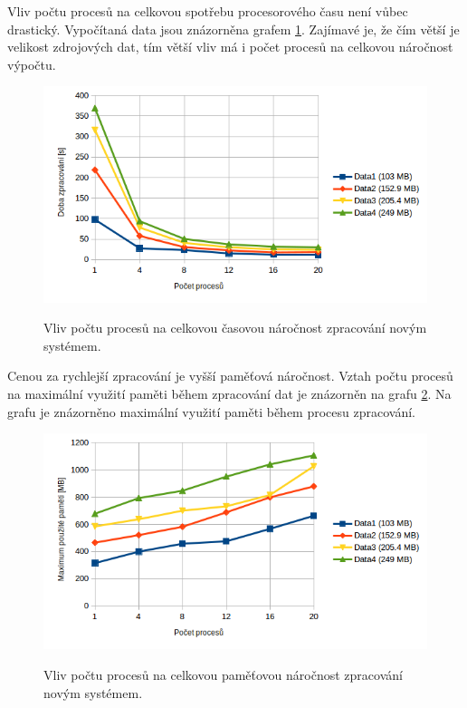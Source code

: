 Vliv počtu procesů na celkovou spotřebu procesorového času není vůbec drastický. Vypočítaná data
jsou znázorněna grafem \ref{graph:graph_procesorovy_cas_vertikalizace}. Zajímavé je,
že čím větší je velikost zdrojových dat, tím větší vliv má i počet procesů na
celkovou náročnost výpočtu.

\begin{figure}[H]
    \begin{center}
        \label{graph:graph_procesorovy_cas_vertikalizace}
        \includegraphics[width=1.0\textwidth]{obrazky-figures/graph_realny_cas_vertikalizace.png}
        \caption{Vliv počtu procesů na celkovou časovou náročnost zpracování novým systémem.}
    \end{center}
\end{figure}

Cenou za rychlejší zpracování je vyšší paměťová náročnost. Vztah počtu procesů na maximální
využití paměti během zpracování dat je znázorněn na grafu \ref{graph:graph_vertikalizace_pamet}.
Na grafu je znázorněno maximální využití paměti během procesu zpracování.

\begin{figure}[H]
    \begin{center}
        \label{graph:graph_vertikalizace_pamet}
        \includegraphics[width=1.0\textwidth]{obrazky-figures/graph_vertikalizace_pamet.png}
        \caption{Vliv počtu procesů na celkovou paměťovou náročnost zpracování novým systémem.}
    \end{center}
\end{figure}


